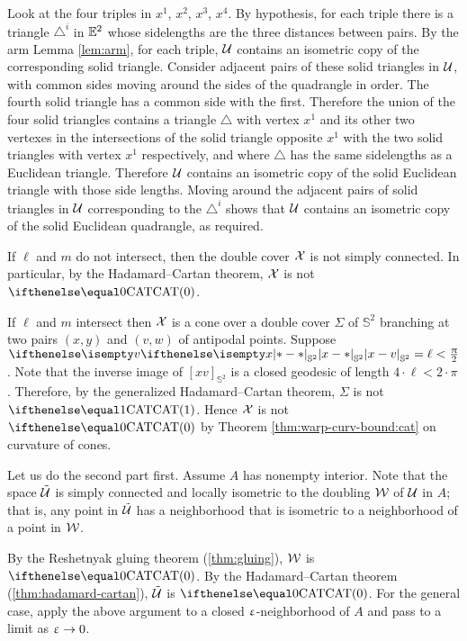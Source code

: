 Look at the four triples in $x^1$, $x^2$, $x^3$, $x^4$.
By  hypothesis, for each triple there is a triangle ${\triangle}^i$ in $\mathbb{E}^2$ whose  sidelengths are the three distances between pairs.
By the arm Lemma \eqref{lem:arm}, for each triple, $\mathcal{U}$ contains an isometric copy of the corresponding solid triangle.
Consider adjacent pairs of these solid triangles in $\mathcal{U}$, with common sides moving around the sides of the quadrangle in order.
The fourth solid triangle has a common side with the first.
Therefore the union of the four solid triangles contains a triangle $\triangle$ with vertex $x^1$ and its other two vertexes in the intersections of the solid  triangle opposite $x^1$ with the two solid triangles with vertex $x^1$ respectively, and where $\triangle$ has the same sidelengths as a Euclidean triangle.
Therefore $\mathcal{U}$ contains an isometric copy of the solid Euclidean triangle with those side lengths.
Moving around the adjacent pairs of solid triangles in $\mathcal{U}$ corresponding to the ${\triangle}^i$ shows that $\mathcal{U}$ contains an isometric copy of the solid Euclidean quadrangle, as required.

If $\ell$ and $m$ do not intersect, then the double cover $\mathcal{X}$ is not simply connected.
In particular, by the Hadamard--Cartan theorem, $\mathcal{X}$ is not $\CAT0$.

If $\ell$ and $m$ intersect then $\mathcal{X}$ is a cone over a double cover $\Sigma$ of $\mathbb{S}^2$ branching at two pairs $(x,y)$ and $(v,w)$ of antipodal points.
Suppose $\dist{x}{v}{\mathbb{S}^2}=\ell<\tfrac\pi2$.
Note that the inverse image of $[xv]_{\mathbb{S}^2}$ is a closed geodesic of length $4\cdot\ell<2\cdot\pi$.
Therefore, by the generalized Hadamard--Cartan theorem, $\Sigma$ is not $\CAT1$. Hence $\mathcal{X}$ is not $\CAT0$ by Theorem \ref{thm:warp-curv-bound:cat}  on curvature of cones.

Let us do the second part first.
Assume $A$ has nonempty interior. 
Note that the space $\tilde{\mathcal{U}}$ is simply connected and locally isometric to the doubling $\mathcal{W}$ of $\mathcal{U}$ in $A$;
that is, any point in $\tilde{\mathcal{U}}$ has a neighborhood 
that is isometric to a neighborhood of a point in $\mathcal{W}$.

By the Reshetnyak gluing theorem (\ref{thm:gluing}), $\mathcal{W}$ is $\CAT0$.
By the Hadamard--Cartan theorem (\ref{thm:hadamard-cartan}), $\tilde{\mathcal{U}}$ is $\CAT0$.
For the general case, apply the above argument to a closed $\upvarepsilon$-neighborhood of $A$
and pass to a limit as $\eps\to 0$.

